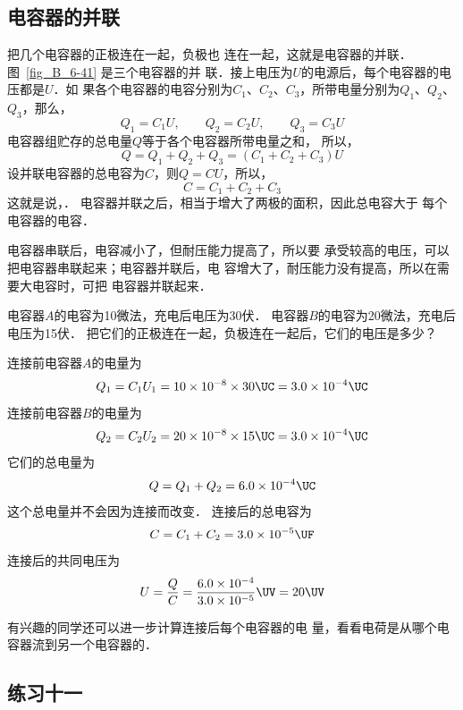 \subsection{电容器的并联} 


把几个电容器的正极连在一起，负极也
连在一起，这就是电容器的并联．图~\ref{fig_B_6-41} 是三个电容器的并
联．接上电压为$U$的电源后，每个电容器的电压都是$U$．如
果各个电容器的电容分别为$C_1$、$C_2$、$C_3$，所带电量分别为$Q_1$、$Q_2$、$Q_3$，那么，
\[Q_1=C_1U,\qquad Q_2=C_2U,\qquad Q_3=C_3U\]
电容器组贮存的总电量$Q$等于各个电容器所带电量之和，
所以，
\[Q=Q_1+Q_2+Q_3=(C_1+C_2+C_3)U\]
设并联电容器的总电容为$C$，则$Q=CU$，所以，
\[C=C_1+C_2+C_3\]
这就是说，．
电容器并联之后，相当于增大了两极的面积，因此总电容大于
每个电容器的电容．

电容器串联后，电容减小了，但耐压能力提高了，所以要
承受较高的电压，可以把电容器串联起来；电容器并联后，电
容增大了，耐压能力没有提高，所以在需要大电容时，可把
电容器并联起来．

\begin{example}
电容器$A$的电容为10微法，充电后电压为30伏．
电容器$B$的电容为20微法，充电后电压为15伏．
把它们的正极连在一起，负极连在一起后，它们的电压是多少？
\end{example}


\begin{solution}
连接前电容器$A$的电量为
\[Q_1=C_1U_1=10\times10^{-8}\times30 \UC =3.0\times10^{-4} \UC \]
连接前电容器$B$的电量为
\[Q_2=C_2U_2=20\times10^{-8}\times 15 \UC =3.0\times10^{-4} \UC \]
它们的总电量为
\[Q=Q_1+Q_2=6.0\times10^{-4} \UC \]
这个总电量并不会因为连接而改变．
连接后的总电容为
\[C=C_1+C_2=3.0\times10^{-5} \UF \]
连接后的共同电压为
\[U=\frac{Q}{C}=\frac{6.0\times10^{-4}}{3.0\times10^{-5}} \UV =20 \UV \]
\end{solution}

有兴趣的同学还可以进一步计算连接后每个电容器的电
量，看看电荷是从哪个电容器流到另一个电容器的．

\subsection*{练习十一}

